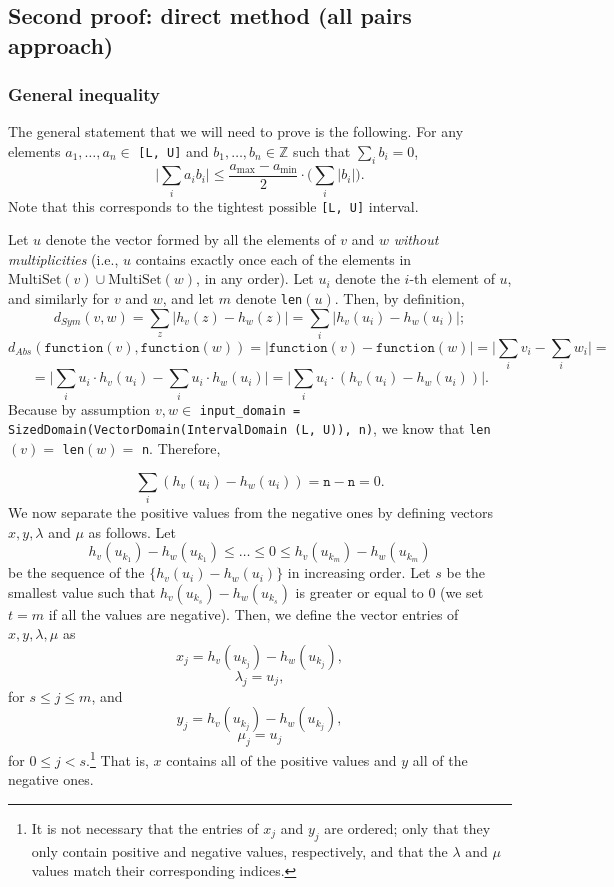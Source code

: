 \documentclass[11pt,a4paper]{article}
\theoremstyle{definition}
\newcommand{\MultiSet}{\mathrm{MultiSet}}
\newcommand{\function}{\texttt{function}}
\begin{document}
\newpage

\subsection{Second proof: direct method (all pairs approach)}
\subsubsection{General inequality}
The general statement that we will need to prove is the following. For any elements $a_1, \ldots, a_n \in$ \texttt{[L, U]} and $b_1, \ldots, b_n \in \mathbb{Z}$ such that $\sum_i b_i = 0$, 
\[
    \Big|\sum_i a_ib_i\Big| \leq \dfrac{a_{\max}-a_{\min}}{2} \cdot \Big(\sum_i |b_i| \Big).
\]
Note that this corresponds to the tightest possible \texttt{[L, U]} interval.

Let $u$ denote the vector formed by all the elements of $v$ and $w$ \textit{without multiplicities} (i.e., $u$ contains exactly once each of the elements in $\MultiSet(v) \cup \MultiSet(w)$, in any order). Let $u_i$ denote the $i$-th element of $u$, and similarly for $v$ and $w$, and let $m$ denote \texttt{len}$(u)$.  
Then, by definition,
\[
    d_{Sym}(v, w) = \sum_z \Big|h_v(z) - h_w(z)\Big| = \sum_i \Big|h_v(u_i) - h_w(u_i)\Big|;
\]
\[
    d_{Abs}(\function(v), \function(w)) = \Big|\function(v) - \function(w)\Big| = \Big|\sum_i v_i - \sum_i w_i\Big| = 
\]
\[
   = \Big|\sum_i u_i \cdot h_v(u_i) - \sum_i u_i \cdot h_w(u_i)\Big| = \Big|\sum_i u_i \cdot (h_v(u_i) - h_w(u_i))\Big|.
\]
Because by assumption $v, w \in $ \texttt{input\_domain = SizedDomain(VectorDomain(IntervalDomain (L, U)), n)}, we know that \texttt{len}$(v) =$ \texttt{len}$(w) =$ \texttt{n}. Therefore,

\begin{equation}\label{eq:sum}
    \sum_i (h_v(u_i) - h_w(u_i)) = \texttt{n}-\texttt{n} = 0.
\end{equation}
We now separate the positive values from the negative ones by defining vectors $x, y, \lambda$ and $\mu$ as follows. Let
\[
    h_v(u_{k_1})-h_w(u_{k_1}) \leq \ldots \leq 0 \leq h_v(u_{k_m})-h_w(u_{k_m}) 
\]
be the sequence of the $\{h_v(u_i)-h_w(u_{i})\}$ in increasing order. Let $s$ be the smallest value such that $h_v(u_{k_s})-h_w(u_{k_s})$ is greater or equal to 0 (we set $t=m$ if all the values are negative). Then, we define the vector entries of $x, y, \lambda, \mu$ as
\[
    x_j = h_v(u_{k_{j}})-h_w(u_{k_{j}}),
\]
\[
    \lambda_j = u_{j},
\]
for $s \leq j \leq m$, and
\[
    y_j = h_v(u_{k_{j}})-h_w(u_{k_{j}}),
\]
\[
    \mu_j = u_j
\]
for $0 \leq j < s$.\footnote{It is not necessary that the entries of $x_j$ and $y_j$ are ordered; only that they only contain positive and negative values, respectively, and that the $\lambda$ and $\mu$ values match their corresponding indices.} That is, $x$ contains all of the positive values and $y$ all of the negative ones.
\end{document}
